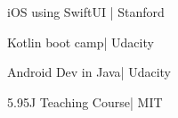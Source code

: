 \documentclass[10pt,a4paper,ragged2e,withhyper]{altacv}
\begin{document}
\begin{paracol}{2}


        \begin{multicols}{2}
            \cvevent
            {\faApple  iOS using SwiftUI} {| Stanford}{}{}

            \divider

            \cvevent
            {\faAndroid  Kotlin boot camp}{| Udacity}{}{}
            \divider

            \cvevent
            {\faAndroid Android Dev in Java}{| Udacity}{}{}
            \divider

            \cvevent
            {\faEdit 5.95J Teaching Course}{| MIT}{}{}
            \divider


            \columnbreak
        \end{multicols}

    \end{paracol}
\end{document}

